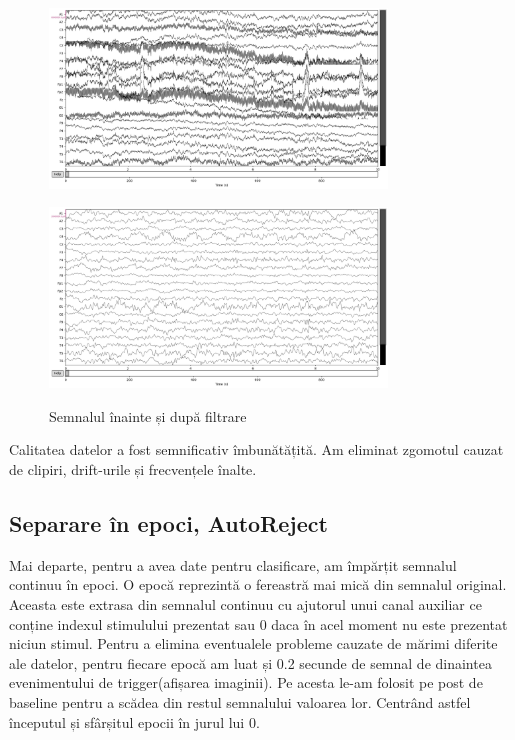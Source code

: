 \setlength{\abovecaptionskip}{0pt}
\setlength{\belowcaptionskip}{0pt}
\clearpage

\begin{figure}[!htb]
    \centering
    \begin{minipage}{\textwidth}
        \centering
        \includegraphics[width=0.8\textwidth]{images/raw_inainte.png}
        \label{fig:raw_inainte}
    \end{minipage}
    \vspace{0.5cm}
    \begin{minipage}{\textwidth}
        \centering
        \includegraphics[width=0.8\textwidth]{images/raw_dupa.png}
        \label{fig:raw_dupa}
    \end{minipage}
    \caption{Semnalul înainte și după filtrare}
    \label{fig:raw_inainte_dupa}
\end{figure}

Calitatea datelor a fost semnificativ îmbunătățită. Am eliminat zgomotul cauzat de clipiri, drift-urile și frecvențele înalte.

\subsection{Separare în epoci, AutoReject}

Mai departe, pentru a avea date pentru clasificare, am împărțit semnalul continuu în epoci. O epocă reprezintă o fereastră mai mică din semnalul original. Aceasta este extrasa din semnalul continuu cu ajutorul unui canal auxiliar ce conține indexul stimulului prezentat sau 0 daca în acel moment nu este prezentat niciun stimul. Pentru a elimina eventualele probleme cauzate de mărimi diferite ale datelor, pentru fiecare epocă am luat și 0.2 secunde de semnal de dinaintea evenimentului de trigger(afișarea imaginii). Pe acesta le-am folosit pe post de baseline pentru a scădea din restul semnalului valoarea lor. Centrând astfel începutul și sfârșitul epocii în jurul lui 0.

